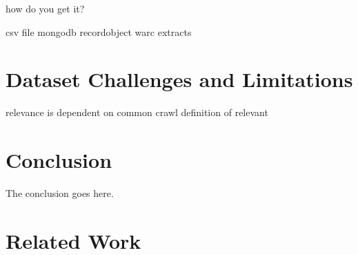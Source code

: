 \documentclass[conference]{IEEEtran}
\begin{document}
how do you get it?

csv file
mongodb recordobject warc extracts




\section{Dataset Challenges and Limitations}






relevance is dependent on common crawl definition of relevant

\section{Conclusion}
The conclusion goes here.

\section{Related Work}
\end{document}
